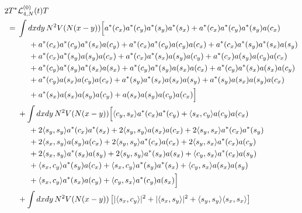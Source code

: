 \documentclass[11pt,a4paper,DIV11]{scrartcl}	%
\newcommand{\cL}{{\cal L}}
\begin{document}
\begin{equation}\label{eq:TL4T} \begin{split} 
2T^* & \cL_{4,N}^{(0)} (t) T \\ =  \; & \int dx dy \, N^2 V (N (x-y)) \Big[ a^* (c_x) a^* (c_y) a^* (s_y) a^* (s_x) + a^* (c_x) a^* (c_y) a^* (s_y) a (c_x)  \\ &\hspace{.5cm} + a^* (c_x) a^* (c_y) a^* (s_x) a(c_y)  + a^* (c_x) a^* (c_y) a (c_y) a (c_x) + a^* (c_x)  a^* (s_y) a^* (s_x) a (s_y)  \\ &\hspace{.5cm}  
+ a^* (c_x) a^* (s_y) a (s_y) a (c_x) + a^* (c_x)  a^* (s_x)  a (s_y) a(c_y) + a^* (c_x) a (s_y) a (c_y) a (c_x)  \\ &\hspace{.5cm}  + a^* (c_y) a^* (s_y) a^* (s_x)  a (s_x) + a^* (c_y) a^* (s_y)  a (s_x) a (c_x) 
+  a^* (c_y)  a^* (s_x) a (s_x) a(c_y)  \\ &\hspace{.5cm}  + a^* (c_y)  a (s_x)  a (c_y) a (c_x) + a^* (s_y)   a^* (s_x) a (s_x) a (s_y) + a^* (s_y)  a (s_x) a (s_y) a (c_x)  \\ &\hspace{.5cm}  + a^* (s_x) a (s_x) a (s_y) a(c_y)  + a (s_x) a (s_y) a (c_y) a (c_x) \Big] \\
&+ \int dx dy \, N^2 V (N (x-y))  \Big[ \langle c_y, s_x \rangle a^* (c_x) a^* (c_y) + \langle s_x, c_y \rangle a (c_y)  a(c_x)   \\ &\hspace{.5cm} + 2 \langle s_y, s_y \rangle a^* (c_x)  a^* (s_x) + 2 \langle s_y, s_y \rangle a (s_x) a (c_x) 
+ 2 \langle s_y, s_x \rangle a^* (c_x)  a^* (s_y)   \\ &\hspace{.5cm}
+ 2\langle s_x , s_y \rangle a (s_y) a (c_x) + 2 \langle s_y, s_y \rangle   a^* (c_x) a (c_x) 
+ 2 \langle s_y , s_x \rangle a^* (c_x) a(c_y) 
  \\ &\hspace{.5cm} + 2 \langle s_x , s_y \rangle  a^* (s_x)  a (s_y) 
+ 2 \langle s_y , s_y \rangle  a^* (s_x)  a (s_x) +  \langle c_y , s_x \rangle  a^* (c_x)   a (s_y)   \\ &\hspace{.5cm} + \langle s_x, c_y \rangle a^* (s_y) a (c_x) 
+  \langle s_x , c_y \rangle a^* (s_y) a^* (s_x)   + \langle c_y , s_x \rangle a (s_x) a (s_y)  
  \\ &\hspace{.5cm} + \langle s_x , c_y \rangle a^* (s_x) a(c_y)  + \langle c_y, s_x \rangle  a^* (c_y) a (s_x) \Big] \\
&+ \int dx dy \, N^2 V (N (x-y)) \left[ |\langle s_x , c_y \rangle|^2  +  |\langle s_x , s_y \rangle|^2   
+ \langle s_y , s_y \rangle \langle s_x ,s_x \rangle \right] 
\end{split} \end{equation}
\end{document}
